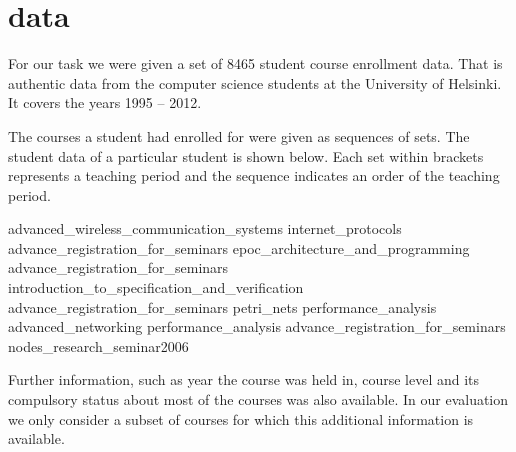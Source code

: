 \section{data}
For our task we were given a set of 8465 student course enrollment data. That is authentic data from the computer science students at the University of Helsinki. It covers the years 1995 – 2012. 

The courses a student had enrolled for were given as sequences of sets. The student data of a particular student is shown below. Each set within { } brackets represents a teaching period and the sequence indicates an order of the teaching period. 

{ advanced_wireless_communication_systems internet_protocols }
{ advance_registration_for_seminars epoc_architecture_and_programming }
{ advance_registration_for_seminars introduction_to_specification_and_verification }
{ advance_registration_for_seminars petri_nets }
{ performance_analysis advanced_networking }
{ performance_analysis }
{ advance_registration_for_seminars }
{ nodes_research_seminar2006 }

Further information, such as year the course was held in,  course level and its compulsory status about most of the courses was also available. In our evaluation we only consider a subset of courses for which this additional information is available.
